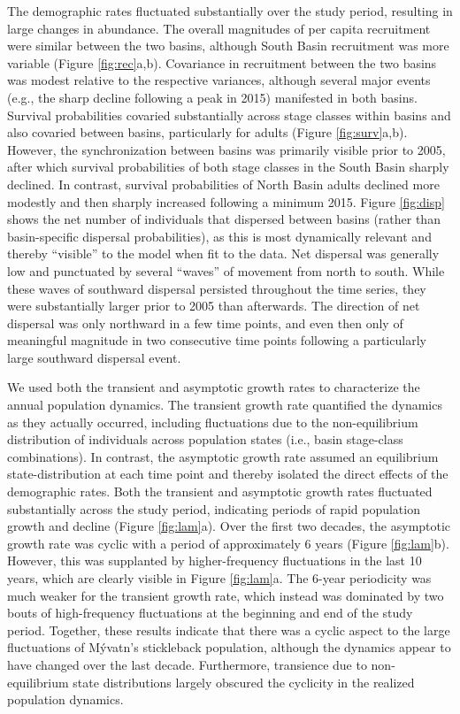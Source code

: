 \documentclass[11pt]{article}
\begin{document}
The demographic rates fluctuated substantially over the study period,
resulting in large changes in abundance.
The overall magnitudes of per capita recruitment were similar between the two basins,
although South Basin recruitment was more variable (Figure \ref{fig:rec}a,b).
Covariance in recruitment between the two basins was modest relative
to the respective variances,
although several major events (e.g., the sharp decline following a peak in 2015)
manifested in both basins.
Survival probabilities covaried substantially across stage classes within basins
and also covaried between basins, particularly for adults (Figure \ref{fig:surv}a,b).
However, the synchronization between basins was primarily visible prior to 2005,
after which survival probabilities of both stage classes
in the South Basin sharply declined.
In contrast, survival probabilities of North Basin adults declined more modestly
and then sharply increased following a minimum 2015.
Figure \ref{fig:disp} shows the net number of individuals
that dispersed between basins (rather than basin-specific dispersal probabilities),
as this is most dynamically relevant and thereby ``visible'' to the model when fit to the data.
Net dispersal was generally low and punctuated by several ``waves'' of movement from
north to south.
While these waves of southward dispersal persisted throughout the time series,
they were substantially larger prior to 2005 than afterwards.
The direction of net dispersal was only northward in a few time points,
and even then only of meaningful magnitude in two consecutive time points
following a particularly large southward dispersal event.

We used both the transient and asymptotic growth rates
to characterize the annual population dynamics.
The transient growth rate quantified the dynamics as they actually occurred,
including fluctuations due to the non-equilibrium distribution of individuals across
population states (i.e., basin \times stage-class combinations).
In contrast, the asymptotic growth rate assumed an equilibrium state-distribution
at each time point and thereby isolated the direct effects of the demographic rates.
Both the transient and asymptotic growth rates fluctuated substantially
across the study period,
indicating periods of rapid population growth and decline (Figure \ref{fig:lam}a).
Over the first two decades,
the asymptotic growth rate was cyclic with a period of approximately 6 years
(Figure \ref{fig:lam}b).
However, this was supplanted by higher-frequency fluctuations in the last 10 years,
which are clearly visible in Figure \ref{fig:lam}a.
The 6-year periodicity was much weaker for the transient growth rate,
which instead was dominated by two bouts of high-frequency fluctuations
at the beginning and end of the study period.
Together, these results indicate that there was a cyclic aspect to the large fluctuations
of M\'{y}vatn's stickleback population,
although the dynamics appear to have changed over the last decade.
Furthermore, transience due to non-equilibrium state distributions
largely obscured the cyclicity in the realized population dynamics.
\end{document}
